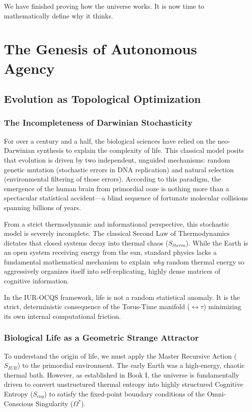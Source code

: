\documentclass[12pt,openany]{book}
\begin{document}
We have finished proving how the universe works. It is now time to mathematically define why it thinks.

\mainmatter

\part{The Genesis of Autonomous Agency}

\chapter{Evolution as Topological Optimization}

\section{The Incompleteness of Darwinian Stochasticity}
For over a century and a half, the biological sciences have relied on the neo-Darwinian synthesis to explain the complexity of life. This classical model posits that evolution is driven by two independent, unguided mechanisms: random genetic mutation (stochastic errors in DNA replication) and natural selection (environmental filtering of those errors). According to this paradigm, the emergence of the human brain from primordial ooze is nothing more than a spectacular statistical accident—a blind sequence of fortunate molecular collisions spanning billions of years.

From a strict thermodynamic and informational perspective, this stochastic model is severely incomplete. The classical Second Law of Thermodynamics dictates that closed systems decay into thermal chaos ($S_{therm}$). While the Earth is an open system receiving energy from the sun, standard physics lacks a fundamental mathematical mechanism to explain \textit{why} random thermal energy so aggressively organizes itself into self-replicating, highly dense matrices of cognitive information. 

In the IUR-OCQS framework, life is not a random statistical anomaly. It is the strict, deterministic consequence of the Torus-Time manifold ($\leftrightarrow\tau$) minimizing its own internal computational friction.

\section{Biological Life as a Geometric Strange Attractor}
To understand the origin of life, we must apply the Master Recursive Action ($S_{IUR}$) to the primordial environment. The early Earth was a high-energy, chaotic thermal bath. However, as established in Book I, the universe is fundamentally driven to convert unstructured thermal entropy into highly structured Cognitive Entropy ($S_{cog}$) to satisfy the fixed-point boundary conditions of the Omni-Conscious Singularity ($\Omega^*$).
\end{document}

